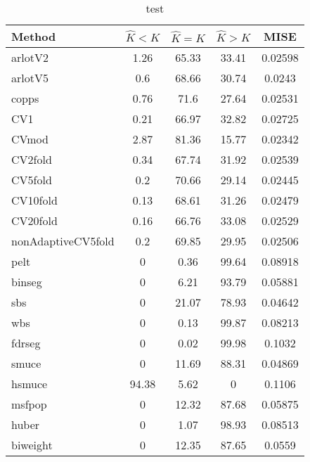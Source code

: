 \begin{table}[ht]
\centering
\begin{tabular}{l|cccc}
  \hline
Method & $\hat{K} < K$ & $\hat{K} = K$ & $\hat{K} > K$ & MISE \\ 
  \hline
arlotV2 &  1.26 & 65.33 & 33.41 & 0.02598 \\ 
  arlotV5 &   0.6 & 68.66 & 30.74 & 0.0243 \\ 
  copps &  0.76 &  71.6 & 27.64 & 0.02531 \\ 
  CV1 &  0.21 & 66.97 & 32.82 & 0.02725 \\ 
  CVmod &  2.87 & 81.36 & 15.77 & 0.02342 \\ 
  CV2fold &  0.34 & 67.74 & 31.92 & 0.02539 \\ 
  CV5fold &   0.2 & 70.66 & 29.14 & 0.02445 \\ 
  CV10fold &  0.13 & 68.61 & 31.26 & 0.02479 \\ 
  CV20fold &  0.16 & 66.76 & 33.08 & 0.02529 \\ 
  nonAdaptiveCV5fold &   0.2 & 69.85 & 29.95 & 0.02506 \\ 
  pelt &     0 &  0.36 & 99.64 & 0.08918 \\ 
  binseg &     0 &  6.21 & 93.79 & 0.05881 \\ 
  sbs &     0 & 21.07 & 78.93 & 0.04642 \\ 
  wbs &     0 &  0.13 & 99.87 & 0.08213 \\ 
  fdrseg &     0 &  0.02 & 99.98 & 0.1032 \\ 
  smuce &     0 & 11.69 & 88.31 & 0.04869 \\ 
  hsmuce & 94.38 &  5.62 &     0 & 0.1106 \\ 
  msfpop &     0 & 12.32 & 87.68 & 0.05875 \\ 
  huber &     0 &  1.07 & 98.93 & 0.08513 \\ 
  biweight &     0 & 12.35 & 87.65 & 0.0559 \\ 
   \hline
\end{tabular}
\caption{test} 
\end{table}
